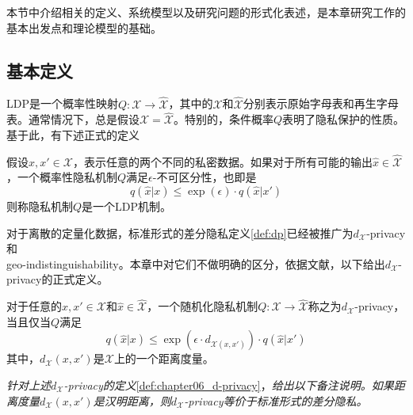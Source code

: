 本节中介绍相关的定义、系统模型以及研究问题的形式化表述，是本章研究工作的基本出发点和理论模型的基础。

\subsection{基本定义}\label{sec:chapter06_basic_definitions}

LDP\cite{duchi2013local}是一个概率性映射$Q:\mathcal{X}\rightarrow \hat{\mathcal{X}}$，其中的$\mathcal{X}$和$\hat{\mathcal{X}}$分别表示原始字母表和再生字母表。通常情况下，总是假设$\mathcal{X}=\hat{\mathcal{X}}$。特别的，条件概率$Q$表明了隐私保护的性质。基于此，有下述正式的定义\cite{kasiviswanathan2011what}
\begin{definition}\label{def:chapter06_LDP}
	假设$x,x' \in \mathcal{X}$，表示任意的两个不同的私密数据。如果对于所有可能的输出$\hat{x} \in \hat{\mathcal{X}}$，一个概率性隐私机制$Q$满足$\epsilon$-不可区分性，也即是
	\begin{equation}
		q(\hat{x}|x) \leq \exp(\epsilon)\cdot q(\hat{x}|x')
	\end{equation}
则称隐私机制$Q$是一个LDP机制。
\end{definition}

对于离散的定量化数据，标准形式的差分隐私定义\ref{def:dp}已经被推广为$d_{\mathcal{X}}$-privacy\cite{chatzikokolakis2013broadening}和\\geo-indistinguishability\cite{andres2013geo,bordenabe2014optimal}。本章中对它们不做明确的区分，依据文献，以下给出$d_{\mathcal{X}}$-privacy的正式定义。

\begin{definition}\label{def:chapter06_d-privacy}
	对于任意的$x,x' \in \mathcal{X}$和$\hat{x} \in \hat{\mathcal{X}}$，一个随机化隐私机制$Q:\mathcal{X}\rightarrow \hat{\mathcal{X}}$称之为$d_{\mathcal{X}}$-privacy，当且仅当$Q$满足
	\begin{equation}
	q(\hat{x}|x) \leq \exp(\epsilon \cdot d_{\mathcal{X}(x,x')}) \cdot q(\hat{x}|x')
	\end{equation}
其中，$d_{\mathcal{X}}(x,x')$是$\mathcal{X}$上的一个距离度量。
\end{definition}

\begin{remark}{\em
针对上述$d_{\mathcal{X}}$-privacy的定义}\ref{def:chapter06_d-privacy}，{\em 给出以下备注说明。如果距离度量$d_{\mathcal{X}}(x,x')$是汉明距离，则$d_{\mathcal{X}}$-privacy等价于标准形式的差分隐私。}
\end{remark}

